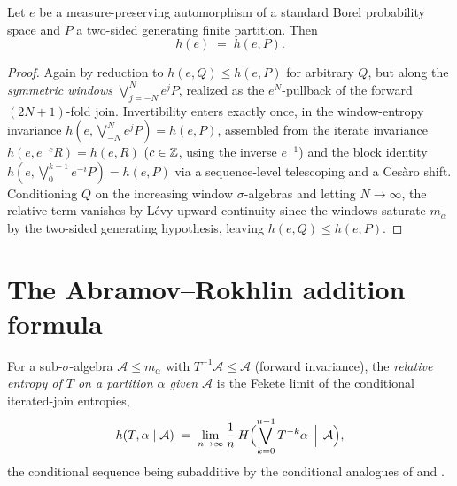 \begin{theorem}\label{ksEntropy_eq_ksEntropyPartition_of_isGeneratingTwoSided}
  \leanok
  Let \(e\) be a measure-preserving automorphism of a standard Borel probability space and \(P\)
  a two-sided generating finite partition. Then
  \[
    h(e) \;=\; h(e,P).
  \]
\end{theorem}
\begin{proof}\leanok
  Again by reduction to \(h(e,Q)\le h(e,P)\) for arbitrary \(Q\), but along the \emph{symmetric
  windows} \(\bigvee_{j=-N}^{N}e^{j}P\), realized as the \(e^{N}\)-pullback of the forward
  \((2N{+}1)\)-fold join. Invertibility enters exactly once, in the window-entropy invariance
  \(h(e,\bigvee_{-N}^{N}e^{j}P)=h(e,P)\), assembled from the iterate invariance
  \(h(e,e^{-c}R)=h(e,R)\) (\(c\in\mathbb{Z}\), using the inverse \(e^{-1}\)) and the block identity
  \(h(e,\bigvee_{0}^{k-1}e^{-i}P)=h(e,P)\) via a sequence-level telescoping and a Ces\`aro shift.
  Conditioning \(Q\) on the increasing window \(\sigma\)-algebras and letting \(N\to\infty\), the
  relative term vanishes by L\'evy-upward continuity since the windows saturate \(m_\alpha\) by
  the two-sided generating hypothesis, leaving \(h(e,Q)\le h(e,P)\).
\end{proof}

\section{The Abramov--Rokhlin addition formula}

\begin{definition}\label{condKsEntropyPartition}
  \leanok
  For a sub-\(\sigma\)-algebra \(\mathcal A\le m_\alpha\) with \(T^{-1}\mathcal A\le\mathcal A\)
  (forward invariance), the \emph{relative entropy of \(T\) on a partition \(\alpha\) given
  \(\mathcal A\)} is the Fekete limit of the conditional iterated-join entropies,
  \[
    h(T,\alpha \mid \mathcal A) \;=\; \lim_{n\to\infty}\frac1n\,
      H\Bigl(\bigvee_{k=0}^{n-1}T^{-k}\alpha \,\Bigm|\, \mathcal A\Bigr),
  \]
  the conditional sequence being subadditive by the conditional analogues of
   and .
\end{definition}

